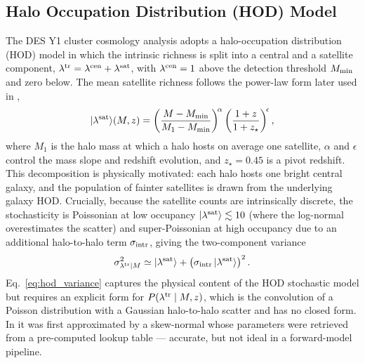 \documentclass[a4paper, 11pt]{article}
\newcommand{\ltr}{\lambda^{\rm tr}}
\begin{document}
\subsection{Halo Occupation Distribution (HOD) Model}

The DES Y1 cluster cosmology analysis \citep[][with weak-lensing mass calibration from \citealt{McClintock2019}]{Costanzi2019cosmo} adopts a halo-occupation distribution (HOD) model in which the intrinsic richness is split into a central and a satellite component, $\ltr = \lambda^{\rm cen} + \lambda^{\rm sat}$, with $\lambda^{\rm cen}=1$ above the detection threshold $M_{\rm min}$ and zero below. The mean satellite richness follows the power-law form later used in \citet{Costanzi2026},
\begin{equation}
|\lambda^{\rm sat}\rangle(M,z)
=
\left(\frac{M-M_{\rm min}}{M_1-M_{\rm min}}\right)^{\!\alpha}
\left(\frac{1+z}{1+z_\star}\right)^{\!\epsilon},
\label{eq:mean_lsat}
\end{equation}
where $M_1$ is the halo mass at which a halo hosts on average one satellite, $\alpha$ and $\epsilon$ control the mass slope and redshift evolution, and $z_\star=0.45$ is a pivot redshift. This decomposition is physically motivated: each halo hosts one bright central galaxy, and the population of fainter satellites is drawn from the underlying galaxy HOD. Crucially, because the satellite counts are intrinsically discrete, the stochasticity is Poissonian at low occupancy $|\lambda^{\rm sat}\rangle\lesssim 10$ (where the log-normal overestimates the scatter) and super-Poissonian at high occupancy due to an additional halo-to-halo term $\sigma_{\rm intr}$, giving the two-component variance
\begin{equation}
\sigma^{2}_{\ltr\mid M}
\simeq
|\lambda^{\rm sat}\rangle
+
\left(\sigma_{\rm intr}\,|\lambda^{\rm sat}\rangle\right)^{2}.
\label{eq:hod_variance}
\end{equation}
Eq.~\eqref{eq:hod_variance} captures the physical content of the HOD stochastic model but requires an explicit form for $P(\ltr\mid M,z)$, which is the convolution of a Poisson distribution with a Gaussian halo-to-halo scatter and has no closed form. In \citet{Costanzi2019cosmo} it was first approximated by a skew-normal whose parameters were retrieved from a pre-computed lookup table --- accurate, but not ideal in a forward-model pipeline.
\end{document}

